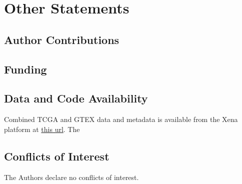 \section{Other Statements}

\subsection{Author Contributions}

\subsection{Funding}

\subsection{Data and Code Availability}
Combined TCGA and GTEX data and metadata is available from the Xena platform at
\href{URLhttps://toil-xena-hub.s3.us-east-1.amazonaws.com/download/TcgaTargetGtex_gene_expected_count.gz }{this url}. The 

\subsection{Conflicts of Interest}
The Authors declare no conflicts of interest.